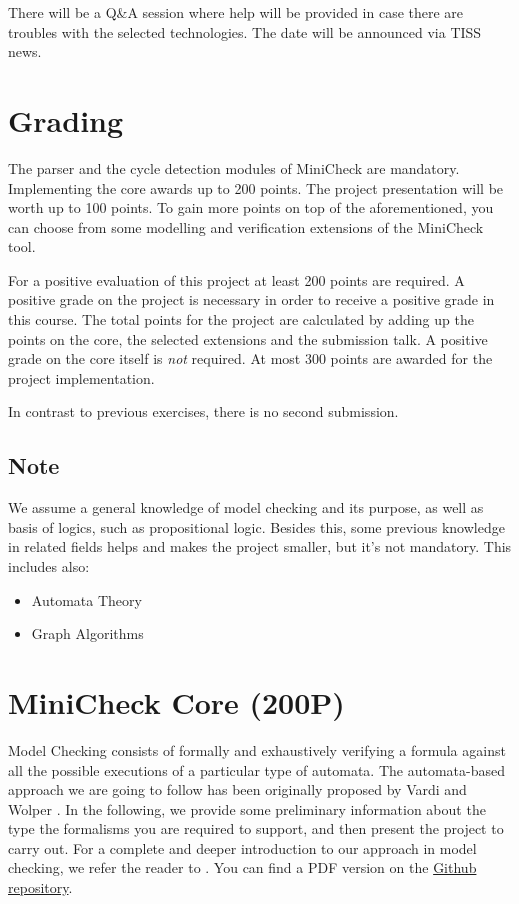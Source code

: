 \documentclass{article}
\begin{document}
There will be a Q\&A session where help will be provided in case there are troubles with the selected technologies. 
The date will be announced via TISS news.

\section{Grading}

The parser and the cycle detection modules of MiniCheck are mandatory. 
Implementing the core awards up to 200 points. The project presentation will be worth up to 100 points. 
To gain more points on top of the aforementioned, you can choose from some modelling 
and verification extensions of the MiniCheck tool.

For a positive evaluation of this project at least 200 points are required. 
A positive grade on the project is necessary in order to receive a positive grade in this course. 
The total points for the project are calculated by adding up the points on the core, 
the selected extensions and the submission talk. A positive grade on the core itself is \textit{not} required. 
At most 300 points are awarded for the project implementation.

In contrast to previous exercises, there is no second submission.

\subsection{Note}
We assume a general knowledge of model checking and its purpose, as well as basis of logics,
such as propositional logic.  Besides this, some previous knowledge in related fields helps 
and makes the project smaller, but it's not mandatory. This includes also:
\begin{itemize}
    \item Automata Theory
    \item Graph Algorithms
\end{itemize}

\section{MiniCheck Core (200P)}

Model Checking consists of formally and exhaustively verifying a formula 
against all the possible executions of a particular type of automata. 
The automata-based approach we are going to follow has been originally proposed by 
Vardi and Wolper \cite{VarWo}.
In the following, we provide some preliminary information 
about the type the formalisms you are required to support, 
and then present the project to carry out. 
For a complete and deeper introduction to our approach in model checking, 
we refer the reader to \cite{BaKa}. You can find a PDF version on the 
\href{https://github.com/francescopont/MiniCheck.git}{Github repository}.
\end{document}
